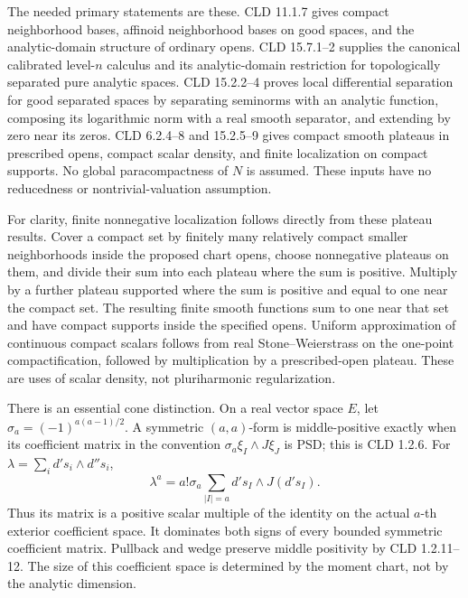 \documentclass[11pt]{article}
\begin{document}
The needed primary statements are these. CLD 11.1.7 gives compact neighborhood bases, affinoid neighborhood bases on good spaces, and the analytic-domain structure of ordinary opens. CLD 15.7.1--2 supplies the canonical calibrated level-\(n\) calculus and its analytic-domain restriction for topologically separated pure analytic spaces. CLD 15.2.2--4 proves local differential separation for good separated spaces by separating seminorms with an analytic function, composing its logarithmic norm with a real smooth separator, and extending by zero near its zeros. CLD 6.2.4--8 and 15.2.5--9 gives compact smooth plateaus in prescribed opens, compact scalar density, and finite localization on compact supports. No global paracompactness of \(N\) is assumed. These inputs have no reducedness or nontrivial-valuation assumption.

For clarity, finite nonnegative localization follows directly from these plateau results. Cover a compact set by finitely many relatively compact smaller neighborhoods inside the proposed chart opens, choose nonnegative plateaus on them, and divide their sum into each plateau where the sum is positive. Multiply by a further plateau supported where the sum is positive and equal to one near the compact set. The resulting finite smooth functions sum to one near that set and have compact supports inside the specified opens. Uniform approximation of continuous compact scalars follows from real Stone--Weierstrass on the one-point compactification, followed by multiplication by a prescribed-open plateau. These are uses of scalar density, not pluriharmonic regularization.

There is an essential cone distinction. On a real vector space \(E\), let \(\sigma_a=(-1)^{a(a-1)/2}\). A symmetric \((a,a)\)-form is middle-positive exactly when its coefficient matrix in the convention \(\sigma_a\xi_I\wedge J\xi_J\) is PSD; this is CLD 1.2.6. For \(\lambda=\sum_i d's_i\wedge d''s_i\),
\[
 \lambda^a=a!\sigma_a\sum_{|I|=a}d's_I\wedge J(d's_I).
\]
Thus its matrix is a positive scalar multiple of the identity on the actual \(a\)-th exterior coefficient space. It dominates both signs of every bounded symmetric coefficient matrix. Pullback and wedge preserve middle positivity by CLD 1.2.11--12. The size of this coefficient space is determined by the moment chart, not by the analytic dimension.
\end{document}
